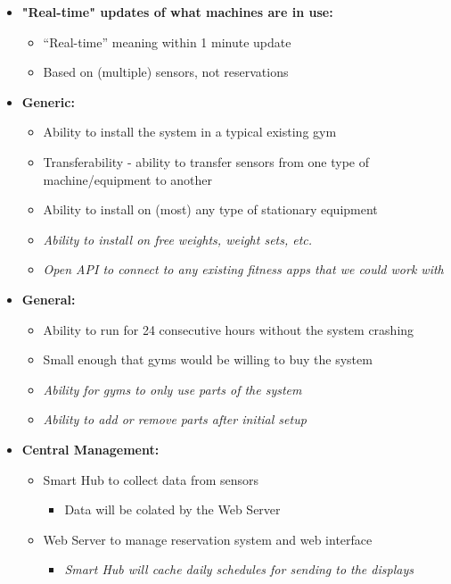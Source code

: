 \documentclass[letterpaper,11pt]{./templates/texMemo} %
\begin{document}
\begin{itemize}
    \item{\textbf{"Real-time" updates of what machines are in use:}}
    \begin{itemize}
        \item{“Real-time” meaning within 1 minute update}
        \item{Based on (multiple) sensors, not reservations}
    \end{itemize}

    \item{\textbf{Generic:}}
    \begin{itemize}
        \item{Ability to install the system in a typical existing gym}
        \item{Transferability - ability to transfer sensors from one type of machine/equipment to another}
        \item{Ability to install on (most) any type of stationary equipment}
        \item{\textit{Ability to install on free weights, weight sets, etc.}}
        \item{\textit{Open API to connect to any existing fitness apps that we could work with}}
    \end{itemize}

    \item{\textbf{General:}}
    \begin{itemize}
        \item{Ability to run for 24 consecutive hours without the system crashing}
        \item{Small enough that gyms would be willing to buy the system}
        \item{\textit{Ability for gyms to only use parts of the system}}
        \item{\textit{Ability to add or remove parts after initial setup}}
    \end{itemize}

    \item{\textbf{Central Management:}}
    \begin{itemize}
        \item{Smart Hub to collect data from sensors}
        \begin{itemize}
            \item{Data will be colated by the Web Server}
        \end{itemize}
        \item{Web Server to manage reservation system and web interface}
        \begin{itemize}
            \item{\textit{Smart Hub will cache daily schedules for sending to the displays}}
        \end{itemize}
    \end{itemize}


\end{itemize}
\end{document}
